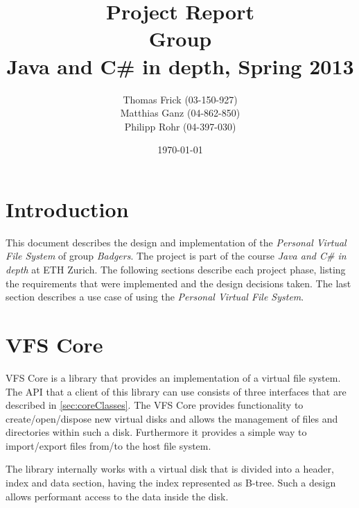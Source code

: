 \documentclass[a4paper,12pt]{article}
\title{
Project Report \\ 
Group \groupname \\
\vspace{5mm}
\large Java and C\# in depth, Spring 2013
}
\author{
Thomas Frick (03-150-927)\\
Matthias Ganz (04-862-850)\\
Philipp Rohr (04-397-030)
}
\date{\today}
\newcommand{\groupname}{Badgers\xspace}
\begin{document}
\maketitle


\section{Introduction}

This document describes the design and implementation of the \emph{Personal
Virtual File System} of group \emph{\groupname}. The project is part of the
course \emph{Java and C\# in depth} at ETH Zurich. The following sections
describe each project phase, listing the requirements that were implemented and
the design decisions taken. The last section describes a use case of using the
\emph{Personal Virtual File System}.


\section{VFS Core}



VFS Core is a library that provides an implementation of a virtual file system.
The API that a client of this library can use consists of three interfaces that
are described in \ref{sec:coreClasses}. The VFS Core provides functionality to
create/open/dispose new virtual disks and allows the management of files and
directories within such a disk. Furthermore it provides a simple way to
import/export files from/to the host file system.

The library internally works with a virtual disk that is divided into a header,
index and data section, having the index represented as B-tree. Such a design
allows performant access to the data inside the disk.






\end{document}
